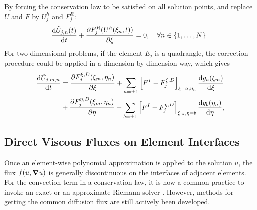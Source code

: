\documentclass[10pt]{article}
\begin{document}
%
By forcing the conservation law to be satisfied on all solution points, and replace $U$ and $F$ by $U_j^h$ and $F_j^{R}$:
$$
\dv{\hat{U}_{j,n}(t)}{t}+\pdv{F_j^{R}(U^{h}(\xi_{n},t))}{\xi}=0,\quad\forall n\in\left\{ 1,\dots,N\right\}.
$$
%
For two-dimensional problems, if the element $E_j$ is a quadrangle, the correction procedure could be applied in a dimension-by-dimension way, which gives
$$
\begin{aligned}\dv{\hat{U}_{j,m,n}}{t} & =\frac{\partial F_{j}^{\xi,D}(\xi_{m},\eta_{n})}{\partial\xi}+\sum_{a=\pm1}\left[F^{I}-F_{j}^{\xi,D}\right]_{\xi=a,\eta_{n}}\dv{g_{a}(\xi_{m})}{\xi}\\
 & +\frac{\partial F_{j}^{\eta,D}(\xi_{m},\eta_{n})}{\partial\eta}+\sum_{b=\pm1}\left[F^{I}-F_{j}^{\eta,D}\right]_{\xi_{m},\eta=b}\dv{g_{b}(\eta_{n})}{\eta},
\end{aligned}
$$

\subsection{Direct Viscous Fluxes on Element Interfaces}
Once an element-wise polynomial approximation is applied to the solution $u$, the flux $f(u,\grad u)$ is generally discontinuous on the interfaces of adjacent elements.
%
For the convection term in a conservation law, it is now a common practice to invoke an exact or an approximate Riemann solver \cite{Toro_2009}.
However, methods for getting the common diffusion flux are still actively been developed.
\end{document}
